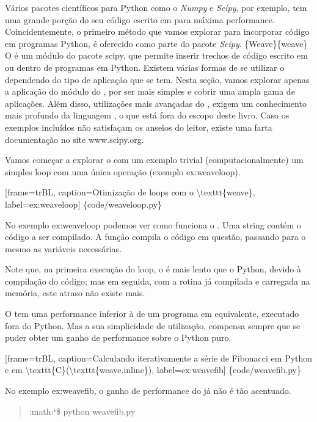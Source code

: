 \documentclass[a4paper,10pt,brazil]{sphinxmanual}
\begin{document}
Vários pacotes científicos para Python como o \emph{Numpy} e \emph{Scipy},
por exemplo, tem uma grande porção do seu código escrito em 
para máxima performance. Coincidentemente, o primeiro método que
vamos explorar para incorporar código  em programas Python, é
oferecido como parte do pacote \emph{Scipy}. \{Weave\}\{weave\} O 
é um módulo do pacote scipy, que permite inserir trechos de código
escrito em  ou  dentro de programas em Python. Existem
várias formas de se utilizar o  dependendo do tipo de
aplicação que se tem. Nesta seção, vamos explorar apenas a
aplicação do módulo  do , por ser mais simples e
cobrir uma ampla gama de aplicações. Além disso, utilizações mais
avançadas do , exigem um conhecimento mais profundo da
linguagem , o que está fora do escopo deste livro. Caso os
exemplos incluídos não satisfaçam os anseios do leitor, existe uma
farta documentação no site www.scipy.org.

Vamos começar a explorar o  com um exemplo trivial
(computacionalmente) um simples loop com uma única operação
(exemplo ex:weaveloop).

{[}frame=trBL, caption=Otimização de loops com o \textbackslash{}texttt\{weave\}, label=ex:weaveloop{]} \{code/weaveloop.py\}

No exemplo ex:weaveloop podemos ver como funciona o . Uma
string contém o código  a ser compilado. A função 
compila o código em questão, passando para o mesmo as variáveis
necessárias.

Note que, na primeira execução do loop, o  é mais lento
que o Python, devido à compilação do código; mas em seguida, com a
rotina já compilada e carregada na memória, este atraso não existe
mais.

O  tem uma performance inferior à de um programa em
 equivalente, executado fora do Python. Mas a sua simplicidade
de utilização, compensa sempre que se puder obter um ganho de
performance sobre o Python puro.

{[}frame=trBL, caption=Calculando iterativamente a série de Fibonacci em Python e em \textbackslash{}texttt\{C\}(\textbackslash{}texttt\{weave.inline\}), label=ex:weavefib{]} \{code/weavefib.py\}

No exemplo ex:weavefib, o ganho de performance do 
já não é tão acentuado.
\begin{quote}

:math:{\color{red}\bfseries{}{}`}\$ python weavefib.py
\end{quote}
\end{document}

